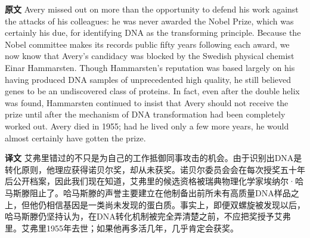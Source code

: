 \documentclass[UTF8,zihao=-4]{ctexart}
\newcommand{\BodyFont}{\fontsize{10.5pt}{15.5pt}\selectfont}
\renewenvironment{quote}{\par\noindent\begingroup\BodyFont}{\par\endgroup}
\begin{document}
\begin{quote}
\noindent\textbf{原文} Avery missed out on more than the opportunity to defend his work against the attacks of his colleagues: he was never awarded the Nobel Prize, which was certainly his due, for identifying DNA as the transforming principle. Because the Nobel committee makes its records public fifty years following each award, we now know that Avery's candidacy was blocked by the Swedish physical chemist Einar Hammarsten. Though Hammarsten's reputation was based largely on his having produced DNA samples of unprecedented high quality, he still believed genes to be an undiscovered class of proteins. In fact, even after the double helix was found, Hammarsten continued to insist that Avery should not receive the prize until after the mechanism of DNA transformation had been completely worked out. Avery died in 1955; had he lived only a few more years, he would almost certainly have gotten the prize.

\smallskip
\noindent\textbf{译文} 艾弗里错过的不只是为自己的工作抵御同事攻击的机会。由于识别出DNA是转化原则，他理应获得诺贝尔奖，却从未获奖。诺贝尔委员会会在每次授奖五十年后公开档案，因此我们现在知道，艾弗里的候选资格被瑞典物理化学家埃纳尔·哈马斯滕阻止了。哈马斯滕的声誉主要建立在他制备出前所未有高质量DNA样品之上，但他仍相信基因是一类尚未发现的蛋白质。事实上，即便双螺旋被发现以后，哈马斯滕仍坚持认为，在DNA转化机制被完全弄清楚之前，不应把奖授予艾弗里。艾弗里1955年去世；如果他再多活几年，几乎肯定会获奖。
\end{quote}
\end{document}
